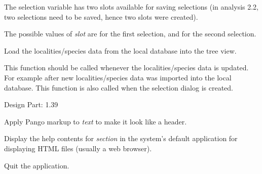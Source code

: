 \documentclass[letterpaper,10pt,english]{sphinxmanual}
\begin{document}
\begin{fulllineitems}
\begin{fulllineitems}
The selection variable has two slots available for saving
selections (in analysis 2.2, two selections need to be saved,
hence two slots were created).

The possible values of \emph{slot} are  for the first selection,
and  for the second selection.

\end{fulllineitems}


\begin{fulllineitems}
\label{setlyze/gui:setlyze.gui.SelectionWindow.update_tree}
Load the localities/species data from the local database into
the tree view.

This function should be called whenever the localities/species
data is updated. For example after new localities/species data
was imported into the local database. This function is also
called when the selection dialog is created.

Design Part: 1.39

\end{fulllineitems}


\end{fulllineitems}


\begin{fulllineitems}
\label{setlyze/gui:setlyze.gui.markup_header}
Apply Pango markup to \emph{text} to make it look like a header.

\end{fulllineitems}


\begin{fulllineitems}
\label{setlyze/gui:setlyze.gui.on_help}
Display the help contents for \emph{section} in the system's default
application for displaying HTML files (usually a web browser).

\end{fulllineitems}


\begin{fulllineitems}
\label{setlyze/gui:setlyze.gui.on_quit}
Quit the application.

\end{fulllineitems}
\end{document}
